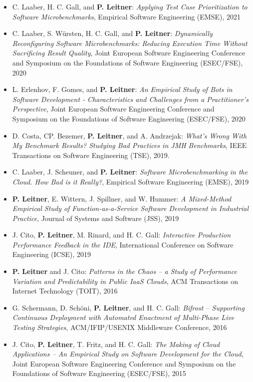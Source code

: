 \documentclass[paper=letter,fontsize=11pt]{scrartcl} %
\begin{document}
\begin{itemize}
	\item C. Laaber, H. C. Gall, and \textbf{P. Leitner}: \emph{Applying Test Case Prioritization to Software Microbenchmarks}, Empirical Software Engineering (EMSE), 2021
\item C. Laaber,  S. W\"ursten, H. C. Gall, and \textbf{P. Leitner}: \emph{Dynamically Reconfiguring Software Microbenchmarks: Reducing Execution Time Without Sacrificing Result Quality}, Joint European Software Engineering Conference and Symposium on the Foundations of Software Engineering (ESEC/FSE), 2020
\item L. Erlenhov,  F. Gomes, and \textbf{P. Leitner}: \emph{An Empirical Study of Bots in Software Development - Characteristics and Challenges from a Practitioner's Perspective}, Joint European Software Engineering Conference and Symposium on the Foundations of Software Engineering (ESEC/FSE), 2020
	\item D. Costa, CP. Bezemer, \textbf{P. Leitner}, and  A. Andrzejak: \emph{What's Wrong With My Benchmark Results? Studying Bad Practices in JMH Benchmarks}, IEEE Transactions on Software Engineering (TSE), 2019.
		\item  C. Laaber, J. Scheuner, and \textbf{P. Leitner}: \emph{Software Microbenchmarking in the Cloud. How Bad is it Really?}, Empirical Software Engineering (EMSE), 2019
	\item \textbf{P. Leitner}, E. Wittern, J. Spillner, and W. Hummer: \emph{A Mixed-Method Empirical Study of Function-as-a-Service Software Development in Industrial Practice}, Journal of Systems and Software (JSS), 2019
	\item J. Cito, \textbf{P. Leitner}, M. Rinard, and H. C. Gall: \emph{Interactive Production Performance Feedback in the IDE}, International Conference on Software Engineering (ICSE),  2019
  \item  \textbf{P. Leitner} and J. Cito: \emph{Patterns in the Chaos -- a Study of Performance Variation and Predictability in Public IaaS Clouds}, ACM Transactions on Internet Technology (TOIT), 2016
  	\item G. Schermann, D. Sch\"oni, \textbf{P. Leitner}, and H. C. Gall: \emph{Bifrost -- Supporting Continuous Deployment with Automated Enactment of Multi-Phase Live Testing Strategies}, ACM/IFIP/USENIX Middleware Conference, 2016
        \item J. Cito, \textbf{P. Leitner}, T. Fritz, and H. C. Gall: \emph{The Making of Cloud Applications -- An Empirical Study on Software Development for the Cloud}, Joint European Software Engineering Conference and Symposium on the Foundations of Software Engineering (ESEC/FSE), 2015
\end{itemize}
\end{document}

